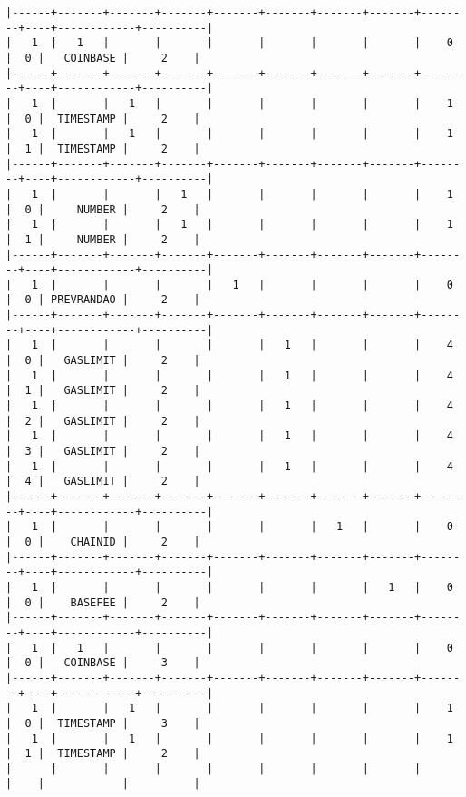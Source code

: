 \documentclass[varwidth=\maxdimen,margin=0.5cm,multi={verbatim}]{standalone}
\begin{document}
\begin{verbatim}
|------+-------+-------+-------+-------+-------+-------+-------+--------+----+------------+----------|
|   1  |   1   |       |       |       |       |       |       |    0   |  0 |   COINBASE |     2    |
|------+-------+-------+-------+-------+-------+-------+-------+--------+----+------------+----------|
|   1  |       |   1   |       |       |       |       |       |    1   |  0 |  TIMESTAMP |     2    |
|   1  |       |   1   |       |       |       |       |       |    1   |  1 |  TIMESTAMP |     2    |
|------+-------+-------+-------+-------+-------+-------+-------+--------+----+------------+----------|
|   1  |       |       |   1   |       |       |       |       |    1   |  0 |     NUMBER |     2    |
|   1  |       |       |   1   |       |       |       |       |    1   |  1 |     NUMBER |     2    |
|------+-------+-------+-------+-------+-------+-------+-------+--------+----+------------+----------|
|   1  |       |       |       |   1   |       |       |       |    0   |  0 | PREVRANDAO |     2    |
|------+-------+-------+-------+-------+-------+-------+-------+--------+----+------------+----------|
|   1  |       |       |       |       |   1   |       |       |    4   |  0 |   GASLIMIT |     2    |
|   1  |       |       |       |       |   1   |       |       |    4   |  1 |   GASLIMIT |     2    |
|   1  |       |       |       |       |   1   |       |       |    4   |  2 |   GASLIMIT |     2    |
|   1  |       |       |       |       |   1   |       |       |    4   |  3 |   GASLIMIT |     2    |
|   1  |       |       |       |       |   1   |       |       |    4   |  4 |   GASLIMIT |     2    |
|------+-------+-------+-------+-------+-------+-------+-------+--------+----+------------+----------|
|   1  |       |       |       |       |       |   1   |       |    0   |  0 |    CHAINID |     2    |
|------+-------+-------+-------+-------+-------+-------+-------+--------+----+------------+----------|
|   1  |       |       |       |       |       |       |   1   |    0   |  0 |    BASEFEE |     2    |
|------+-------+-------+-------+-------+-------+-------+-------+--------+----+------------+----------|
|   1  |   1   |       |       |       |       |       |       |    0   |  0 |   COINBASE |     3    |
|------+-------+-------+-------+-------+-------+-------+-------+--------+----+------------+----------|
|   1  |       |   1   |       |       |       |       |       |    1   |  0 |  TIMESTAMP |     3    |
|   1  |       |   1   |       |       |       |       |       |    1   |  1 |  TIMESTAMP |     2    |
|      |       |       |       |       |       |       |       |        |    |            |          |

\end{verbatim}
\end{document}
